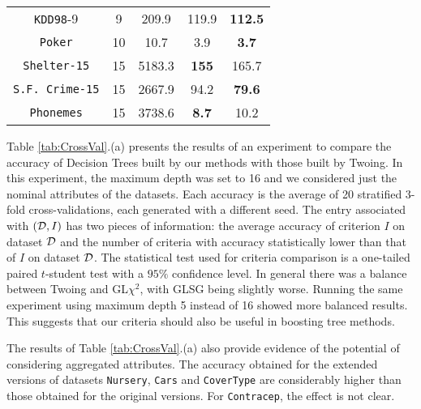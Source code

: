 \begin{table}[]
\begin{tabular}{c|c|c|c|c}
{\tt KDD98}-9       & 9  & 209.9         & 119.9     & {\bf 112.5}  \\
{\tt Poker}         & 10 & 10.7          & 3.9       & {\bf 3.7}    \\ 
{\tt Shelter-15}    & 15 & 5183.3        &{\bf 155}  & 165.7        \\   
{\tt S.F. Crime-15} & 15 & 2667.9        & 94.2      &{\bf 79.6}    \\ 
{\tt Phonemes}      & 15 & 3738.6        &{\bf 8.7}  & 10.2         
\end{tabular}
\label{tab:time}
\end{table}

Table \ref{tab:CrossVal}.(a) presents  the results of an experiment to
compare the accuracy of  Decision Trees built by  our methods with those built by Twoing.
In this experiment, the maximum depth was set to 16 and we considered just the nominal attributes of the datasets. 
Each accuracy is the average of 20 stratified 3-fold cross-validations,
each generated with a different seed.
The entry  associated with  $({\cal D},I)$ has two pieces of information: the average accuracy
of criterion $I$ on dataset ${\cal D}$ and the number of criteria
with accuracy   statistically lower than that of $I$ on dataset ${\cal D}$. 
The statistical test used for criteria comparison is a  one-tailed paired $t$-student test with a $95\% $ confidence level. 
In general there was a balance between Twoing and GL$\chi^2$, with GLSG being slightly worse.
Running the same experiment using maximum depth 5 instead of 16 showed more balanced results.
This suggests that our criteria should also be useful in boosting tree methods.


The results of  Table \ref{tab:CrossVal}.(a) also
provide evidence of  the potential
of considering aggregated attributes. 
The accuracy obtained for the extended versions of datasets
{\tt Nursery}, {\tt Cars} and {\tt CoverType} are considerably higher than those obtained for 
the original versions. For {\tt Contracep}, the effect is not clear.



